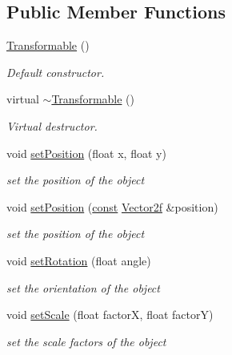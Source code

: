 \subsection*{Public Member Functions}
\begin{DoxyCompactItemize}
\item 
\hyperlink{classsf_1_1_transformable_ae71710de0fef423121bab1c684954a2e}{Transformable} ()
\begin{DoxyCompactList}\small\item\em Default constructor. \end{DoxyCompactList}\item 
virtual \hyperlink{classsf_1_1_transformable_a43253abcb863195a673c2a347a7425cc}{$\sim$\-Transformable} ()
\begin{DoxyCompactList}\small\item\em Virtual destructor. \end{DoxyCompactList}\item 
void \hyperlink{classsf_1_1_transformable_a4dbfb1a7c80688b0b4c477d706550208}{set\-Position} (float x, float y)
\begin{DoxyCompactList}\small\item\em set the position of the object \end{DoxyCompactList}\item 
void \hyperlink{classsf_1_1_transformable_af1a42209ce2b5d3f07b00f917bcd8015}{set\-Position} (\hyperlink{term__entry_8h_a57bd63ce7f9a353488880e3de6692d5a}{const} \hyperlink{namespacesf_a80cea3c46537294fd1d8d428566ad8b2}{Vector2f} \&position)
\begin{DoxyCompactList}\small\item\em set the position of the object \end{DoxyCompactList}\item 
void \hyperlink{classsf_1_1_transformable_a32baf2bf1a74699b03bf8c95030a38ed}{set\-Rotation} (float angle)
\begin{DoxyCompactList}\small\item\em set the orientation of the object \end{DoxyCompactList}\item 
void \hyperlink{classsf_1_1_transformable_aaec50b46b3f41b054763304d1e727471}{set\-Scale} (float factor\-X, float factor\-Y)
\begin{DoxyCompactList}\small\item\em set the scale factors of the object \end{DoxyCompactList}\item 

\end{DoxyCompactItemize}
